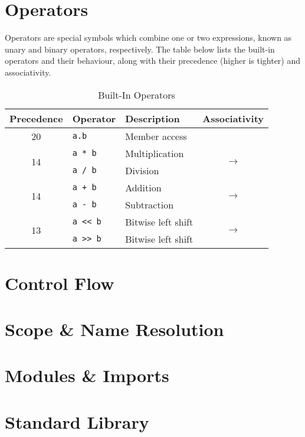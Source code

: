 \documentclass{article}
\begin{document}
    \section{Operators}

    Operators are special symbols which combine one or two expressions, known as unary and binary operators, respectively.
    The table below lists the built-in operators and their behaviour, along with their precedence (higher is tighter) and associativity.

    \begin{table}[h]
        \caption{Built-In Operators}
        \begin{tabular}{|c|l|l|c|}
            \hline
            \textbf{Precedence} & \textbf{Operator} & \textbf{Description} & \textbf{Associativity} \\
            \hline
            \multirow{1}{*}{20} & \texttt{a.b} & Member access \\
            \hline
            \multirow{2}{*}{14} & \texttt{a * b} & Multiplication & \multirow{2}{*}{\(\longrightarrow\)} \\
            & \texttt{a / b} & Division & \\
            \hline
            \multirow{2}{*}{14} & \texttt{a + b} & Addition & \multirow{2}{*}{\(\longrightarrow\)} \\
            & \texttt{a - b} & Subtraction & \\
            \hline
            \multirow{2}{*}{13} & \texttt{a << b} & Bitwise left shift & \multirow{2}{*}{\(\longrightarrow\)} \\
            & \texttt{a >> b} & Bitwise left shift & \\
            \hline
        \end{tabular}\label{tab:builtin-operators}
    \end{table}

    \section{Control Flow}

    \section{Scope \& Name Resolution}\label{sec:scope}

    \section{Modules \& Imports}

    \section{Standard Library}
\end{document}
